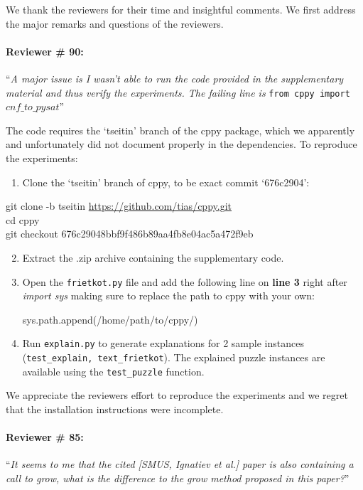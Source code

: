 \documentclass{article}
\begin{document}
We thank the reviewers for their time and insightful comments. We first address the major remarks and questions of the reviewers.

\paragraph{Reviewer \# 90:} ``\textit{A major issue is I wasn't able to run the code provided in the supplementary material and thus verify the experiments. The failing line is} \texttt{from cppy import $cnf\_to\_pysat$}''

The code requires the `tseitin' branch of the cppy package, which we apparently and unfortunately did not document properly in the dependencies. To reproduce the experiments:
\begin{enumerate}
	\item Clone the `tseitin' branch of cppy, to be exact commit `676c2904':
\end{enumerate}
{\footnotesize git clone -b tseitin \url{https://github.com/tias/cppy.git}}\\
{\footnotesize cd cppy} \\
{\footnotesize {git checkout 676c29048bbf9f486b89aa4fb8e04ac5a472f9eb}} 
\begin{enumerate}
	\setcounter{enumi}{1}
	\item Extract the .zip archive containing the supplementary code.
	\item Open the \texttt{frietkot.py} file and add the following line on \textbf{line 3} right after \emph{import sys} making sure to replace the path to cppy with your own:
	\begin{center}
	{ sys.path.append(\textquotesingle/home/path/to/cppy/\textquotesingle)}	
	\end{center}
	\item Run \texttt{explain.py} to generate explanations for 2 sample instances (\texttt{test\_explain, text\_frietkot}). The explained puzzle instances are available using the \texttt{test\_puzzle} function.
\end{enumerate}
We appreciate the reviewers effort to reproduce the experiments and we regret that the installation instructions were incomplete.


\paragraph{Reviewer \# 85:}``\textit{It seems to me that the cited [SMUS, Ignatiev et al.] paper is also containing a call to grow, what is the difference to the grow method proposed in this paper?}''
\end{document}
